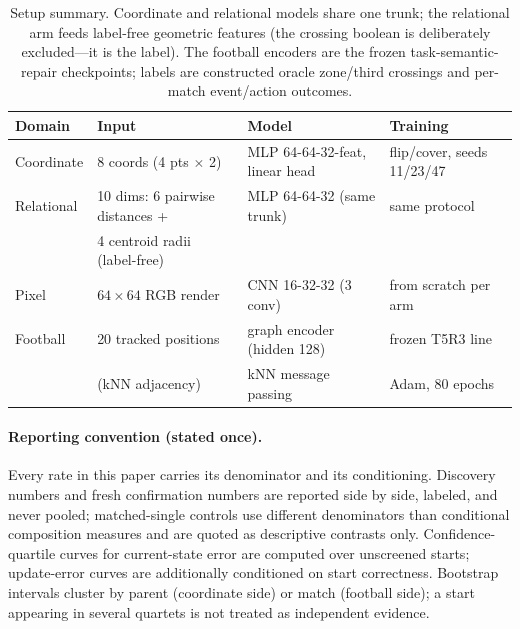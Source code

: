 \begin{table}[t]
\centering
\footnotesize
\begin{tabular}{@{}llll@{}}
\toprule
Domain & Input & Model & Training \\
\midrule
Coordinate & 8 coords (4 pts $\times$ 2) & MLP 64-64-32-feat, linear head &
flip/cover, seeds 11/23/47 \\
Relational & 10 dims: 6 pairwise distances + &
MLP 64-64-32 (same trunk) & same protocol \\
& 4 centroid radii (label-free) & & \\
Pixel & $64\times64$ RGB render & CNN 16-32-32 (3 conv) & from scratch per arm \\
Football & 20 tracked positions & graph encoder (hidden 128) &
frozen T5R3 line \\
& (kNN adjacency) & kNN message passing & Adam, 80 epochs \\
\bottomrule
\end{tabular}
\caption{Setup summary. Coordinate and relational models share one trunk;
the relational arm feeds label-free geometric features (the crossing
boolean is deliberately excluded---it is the label). The football encoders
are the frozen task-semantic-repair checkpoints; labels are constructed
oracle zone/third crossings and per-match event/action outcomes.}
\label{tab:setup}
\end{table}

\paragraph{Reporting convention (stated once).} Every rate in this paper
carries its denominator and its conditioning. Discovery numbers and fresh
confirmation numbers are reported side by side, labeled, and never pooled;
matched-single controls use different denominators than conditional
composition measures and are quoted as descriptive contrasts only.
Confidence-quartile curves for current-state error are computed over
unscreened starts; update-error curves are additionally conditioned on
start correctness. Bootstrap intervals cluster by parent (coordinate side)
or match (football side); a start appearing in several quartets is not
treated as independent evidence.
